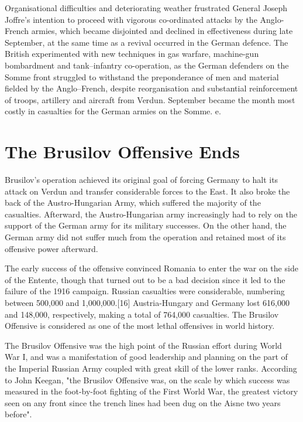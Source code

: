 \documentclass[a4paper,]{book}
\begin{document}
Organisational difficulties and deteriorating weather frustrated General Joseph Joffre's intention to proceed with vigorous co-ordinated attacks by the Anglo-French armies, which became disjointed and declined in effectiveness during late September, at the same time as a revival occurred in the German defence. The British experimented with new techniques in gas warfare, machine-gun bombardment and tank–infantry co-operation, as the German defenders on the Somme front struggled to withstand the preponderance of men and material fielded by the Anglo–French, despite reorganisation and substantial reinforcement of troops, artillery and aircraft from Verdun. September became the month most costly in casualties for the German armies on the Somme. e. 

\section{The Brusilov Offensive Ends}

Brusilov's operation achieved its original goal of forcing Germany to halt its attack on Verdun and transfer considerable forces to the East. It also broke the back of the Austro-Hungarian Army, which suffered the majority of the casualties. Afterward, the Austro-Hungarian army increasingly had to rely on the support of the German army for its military successes. On the other hand, the German army did not suffer much from the operation and retained most of its offensive power afterward.

The early success of the offensive convinced Romania to enter the war on the side of the Entente, though that turned out to be a bad decision since it led to the failure of the 1916 campaign. Russian casualties were considerable, numbering between 500,000 and 1,000,000.[16] Austria-Hungary and Germany lost 616,000 and 148,000, respectively, making a total of 764,000 casualties. The Brusilov Offensive is considered as one of the most lethal offensives in world history.

The Brusilov Offensive was the high point of the Russian effort during World War I, and was a manifestation of good leadership and planning on the part of the Imperial Russian Army coupled with great skill of the lower ranks. According to John Keegan, "the Brusilov Offensive was, on the scale by which success was measured in the foot-by-foot fighting of the First World War, the greatest victory seen on any front since the trench lines had been dug on the Aisne two years before".
\end{document}
